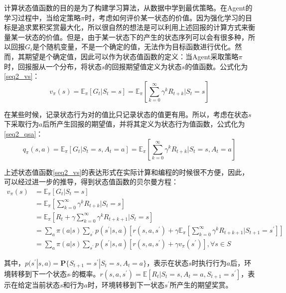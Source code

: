 计算状态值函数的目的是为了构建学习算法，从数据中学到最优策略。在Agent的学习过程中，当给定策略$\pi$时，考虑如何评价某一状态的价值。因为强化学习的目标是追求累积奖赏最大化，所以很自然的想法是可以利用上述回报的计算方式来衡量某一状态的价值。但是，由于某一状态下的产生的状态序列可以会有很多种，所以回报$G_{t}$是个随机变量，不是一个确定的值，无法作为目标函数进行优化。然而，其期望是个确定值，因此可以作为状态值函数的定义：当Agent采取策略$\pi$时，回报服从一个分布，将状态$s$的回报期望值定义为状态$s$的值函数。公式化为\eqref{seq2_vs}：
\begin{equation}
\label{seq2_vs}
v_{\pi}(s)=\mathbb{E}_{\pi}[G_{t}|S_t=s]=\mathbb{E}_{\pi}[\sum_{k=0}^{\infty}\gamma^{k}R_{t+k}|S_t=s]
\end{equation}


在某些时候，记录状态行为对的值比只记录状态的值更有用。所以，考虑在状态$s$下采取行为$a$后所产生回报的期望值，并将其定义为状态行为值函数，公式化为\eqref{seq2_qsa}：
\begin{equation}
\label{seq2_qsa}
q_{\pi}(s,a)=\mathbb{E}_{\pi}[G_{t}|S_t=s,A_t=a]
=\mathbb{E}_{\pi}[\sum_{k=0}^{\infty}\gamma^{k}R_{t+k}|S_t=s,A_t=a]
\end{equation}

上述状态值函数\eqref{seq2_vs}的表达形式在实际计算和编程的时候很不方便，因此，可以经过进一步的推导，得到状态值函数的贝尔曼方程：
\begin{equation}
\label{seq1}
\begin{aligned}
v_{\pi}(s)&=\mathbb{E}_{\pi}[G_{t}|S_t=s]\\
&=\mathbb{E}_{\pi}[\sum_{k=0}^{\infty}\gamma^{k}R_{t+k} | S_t=s]\\
&=\mathbb{E}_{\pi}[R_{t} + \gamma \sum_{k=0}^{\infty}\gamma^{k}R_{t+k+1}|S_t=s]\\
&=\sum_{a}\pi(a|s)\sum_{s^{'}}p(s^{'}|s,a)[r(s,a,s^{'}) + \gamma \mathbb{E}_{\pi}[\sum_{k=0}^{\infty}\gamma^{k} R_{t+k+1} |S_{t+1}=s^{'}]]\\
&=\sum_{a}\pi(a|s)\sum_{s^{'}}p(s^{'}|s,a)[r(s,a,s^{'})+\gamma v_{\pi}(s^{'})], \forall s \in S
\end{aligned}
\end{equation}

其中，$p(s^{'}|s,a) = \bm{\text{P}}\{S_{t+1}=s^{'}|S_{t}=s, A_{t}=a\}$，表示在状态$s$时执行行为$a$后，环境转移到下一个状态$s_{'}$的概率。$r(s,a,s^{'})=\mathbb{E}[R_{t}|S_{t}=s,A_{t}=a,S_{t+1}=s^{'}]
$，表示在给定当前状态$s$和行为$a$时，环境转移到下一状态$s^{'}$所产生的期望奖赏。

